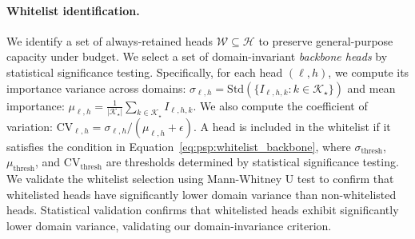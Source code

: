 \paragraph{Whitelist identification.}
\label{app:whitelist_details}
We identify a set of always-retained heads $\mathcal{W} \subseteq \mathcal{H}$ to preserve general-purpose capacity under budget.
We select a set of domain-invariant \emph{backbone heads} by statistical significance testing.
Specifically, for each head $(\ell,h)$, we compute its importance variance across domains: $\sigma_{\ell,h} = \mathrm{Std}(\{I_{\ell,h,k}: k \in \mathcal{K}_\star\})$ and mean importance: $\mu_{\ell,h} = \frac{1}{|\mathcal{K}_\star|} \sum_{k \in \mathcal{K}_\star} I_{\ell,h,k}$.
We also compute the coefficient of variation: $\mathrm{CV}_{\ell,h} = \sigma_{\ell,h} / (\mu_{\ell,h} + \epsilon)$.
A head is included in the whitelist if it satisfies the condition in Equation~\eqref{eq:psp:whitelist_backbone}, where $\sigma_{\mathrm{thresh}}$, $\mu_{\mathrm{thresh}}$, and $\mathrm{CV}_{\mathrm{thresh}}$ are thresholds determined by statistical significance testing.
We validate the whitelist selection using Mann-Whitney U test to confirm that whitelisted heads have significantly lower domain variance than non-whitelisted heads.
Statistical validation confirms that whitelisted heads exhibit significantly lower domain variance, validating our domain-invariance criterion.


